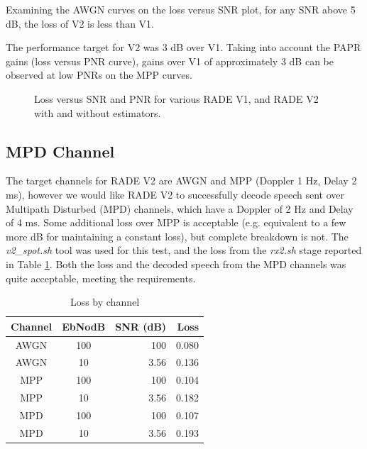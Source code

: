 \documentclass{article}
\begin{document}
Examining the AWGN curves on the loss versus SNR plot, for any SNR above 5 \si{dB}, the loss of V2 is less than V1.

The performance target for V2 was 3 \si{dB} over V1. Taking into account the PAPR gains (loss versus PNR curve), gains over V1 of approximately 3 \si{dB} can be observed at low PNRs on the MPP curves.

\begin{figure}[h]
\caption{Loss versus SNR and PNR for various RADE V1, and RADE V2 with and without estimators.}
\label{fig:260203_inf_loss_SNR3k_models}
\begin{center}
\end{center}
\end{figure}

\subsection{MPD Channel}

The target channels for RADE V2 are AWGN and MPP (Doppler 1 \si{Hz}, Delay 2 \si{ms}), however we would like RADE V2 to successfully decode speech sent over Multipath Disturbed (MPD) channels, which have a Doppler of 2 \si{Hz} and Delay of 4 \si{ms}. Some additional loss over MPP is acceptable (e.g. equivalent to a few more \si{dB} for maintaining a constant loss), but complete breakdown is not.  The \emph{v2\_spot.sh} tool was used for this test, and the loss from the \emph{rx2.sh} stage reported in Table \ref{tab:loss_by_channel}.  Both the loss and the decoded speech from the MPD channels was quite acceptable, meeting the requirements.
 
\begin{table} [h]
\caption{Loss by channel}
\label{tab:loss_by_channel}
\centering
\begin{tabular}{ c | c | r | r }
 \hline
 Channel & EbNodB & SNR (\si{dB}) & Loss \\
 \hline
 AWGN & 100 & 100 & 0.080 \\
 AWGN & 10 & 3.56 & 0.136 \\
 MPP & 100 & 100 &  0.104\\
 MPP & 10 & 3.56 & 0.182 \\
 MPD & 100 & 100 & 0.107 \\
 MPD & 10 &  3.56 & 0.193 \\
 \hline
\end{tabular}
\end{table}
\end{document}
